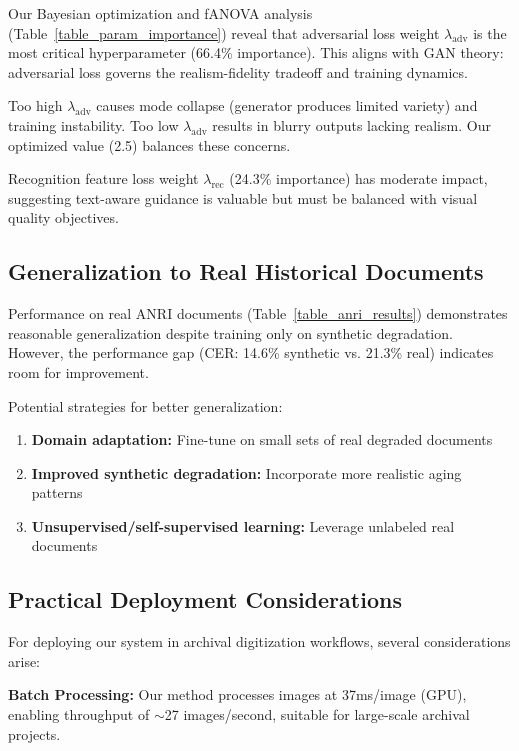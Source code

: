 \documentclass[journal]{IEEEtran}
\begin{document}
Our Bayesian optimization and fANOVA analysis (Table~\ref{table_param_importance}) reveal that adversarial loss weight $\lambda_{\text{adv}}$ is the most critical hyperparameter (66.4\% importance). This aligns with GAN theory: adversarial loss governs the realism-fidelity tradeoff and training dynamics.

Too high $\lambda_{\text{adv}}$ causes mode collapse (generator produces limited variety) and training instability. Too low $\lambda_{\text{adv}}$ results in blurry outputs lacking realism. Our optimized value (2.5) balances these concerns.

Recognition feature loss weight $\lambda_{\text{rec}}$ (24.3\% importance) has moderate impact, suggesting text-aware guidance is valuable but must be balanced with visual quality objectives.

\subsection{Generalization to Real Historical Documents}

Performance on real ANRI documents (Table~\ref{table_anri_results}) demonstrates reasonable generalization despite training only on synthetic degradation. However, the performance gap (CER: 14.6\% synthetic vs. 21.3\% real) indicates room for improvement.

Potential strategies for better generalization:
\begin{enumerate}
    \item \textbf{Domain adaptation:} Fine-tune on small sets of real degraded documents
    \item \textbf{Improved synthetic degradation:} Incorporate more realistic aging patterns
    \item \textbf{Unsupervised/self-supervised learning:} Leverage unlabeled real documents
\end{enumerate}

\subsection{Practical Deployment Considerations}

For deploying our system in archival digitization workflows, several considerations arise:

\textbf{Batch Processing:} Our method processes images at 37ms/image (GPU), enabling throughput of $\sim$27 images/second, suitable for large-scale archival projects.
\end{document}
